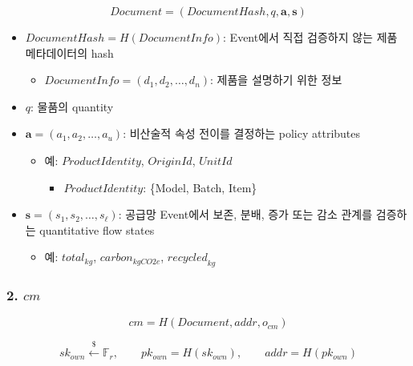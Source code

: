 \documentclass[11pt,a4paper]{extarticle}
\begin{document}
\[
  \mathit{Document}
  =
  (\mathit{DocumentHash},q,\mathbf{a},\mathbf{s})
\]

\begin{itemize}
  \item \(\mathit{DocumentHash}=H(\mathit{DocumentInfo})\):
        Event에서 직접 검증하지 않는 제품 메타데이터의 hash

        \begin{itemize}
          \item \(\mathit{DocumentInfo}=(d_1,d_2,\ldots,d_n)\):
                제품을 설명하기 위한 정보
        \end{itemize}


  \item \(q\):
        물품의 quantity

  \item \(\mathbf{a}=(a_1,a_2,\ldots,a_u)\):
        비산술적 속성 전이를 결정하는 policy attributes

        \begin{itemize}
          \item 예:
                \(\mathit{ProductIdentity}\), \(\mathit{OriginId}\),
                \(\mathit{UnitId}\)
                \begin{itemize}
                  \item \(\mathit{ProductIdentity}\): \{Model, Batch, Item\}
                \end{itemize}
        \end{itemize}

  \item \(\mathbf{s}=(s_1,s_2,\ldots,s_{\ell})\):
        공급망 Event에서 보존, 분배, 증가 또는 감소 관계를 검증하는
        quantitative flow states

        \begin{itemize}
          \item 예:
                \(\mathit{total}_{kg}\), \(\mathit{carbon}_{kgCO2e}\),
                \(\mathit{recycled}_{kg}\)
        \end{itemize}
\end{itemize}

\subsubsection*{2. \(cm\)}

\[
  cm
  =
  H(
  \mathit{Document},
  addr,
  o_{cm}
  )
\]

\[
  sk_{own}\xleftarrow{\$}\mathbb{F}_r,
  \qquad
  pk_{own}=H(sk_{own}),
  \qquad
  addr=H(pk_{own})
\]
\end{document}
